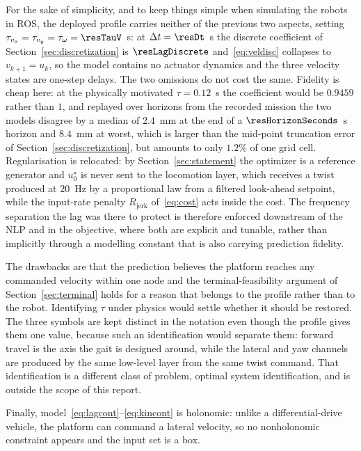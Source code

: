 \documentclass[11pt,a4paper]{article}
\newcommand{\Rjerk}{R_{\mathrm{jerk}}}
\begin{document}
For the sake of simplicity, and to keep things simple when simulating the robots in ROS, the deployed profile carries neither of the previous two aspects, setting $\tau_{v_x}=\tau_{v_y}=\tau_\omega=\resTauV$~s: at
$\Delta t=\resDt$~s the discrete coefficient of Section~\ref{sec:discretization} is $\resLagDiscrete$
and~\eqref{eq:veldisc} collapses to $v_{k+1}=u_k$, so the model contains no actuator dynamics and the three
velocity states are one-step delays. The two omissions do not cost the same. Fidelity is cheap here: at the
physically motivated $\tau=0.12$~s the coefficient would be $0.9459$ rather than $1$, and replayed over
horizons from the recorded mission the two models disagree by a median of $2.4$~mm at the end of a
$\resHorizonSeconds$~s horizon and $8.4$~mm at worst, which is larger than the mid-point truncation error of
Section~\ref{sec:discretization}, but amounts to only $1.2\%$ of one grid cell. Regularisation is relocated: by Section~\ref{sec:statement} the optimizer is a reference generator and $u^\star_0$ is never
sent to the locomotion layer, which receives a twist produced at $20$~Hz by a proportional law from a
filtered look-ahead setpoint, while the input-rate penalty $\Rjerk$ of~\eqref{eq:cost} acts inside the cost.
The frequency separation the lag was there to protect is therefore enforced downstream of the NLP and in the
objective, where both are explicit and tunable, rather than implicitly through a modelling constant that is
also carrying prediction fidelity.

The drawbacks are that the prediction believes the platform reaches any commanded velocity
within one node and the terminal-feasibility
argument of Section~\ref{sec:terminal} holds for a reason that belongs to the profile rather than to the
robot. Identifying $\tau$ under physics would settle whether it should be restored. The three symbols are
kept distinct in the notation even though the profile gives them one value, because such an identification
would separate them: forward travel is the axis the gait is designed around, while the lateral and yaw
channels are produced by the same low-level layer from the same twist command. That identification is a
different class of problem, optimal system identification, and is outside the scope of this report.

Finally, model~\eqref{eq:lagcont}--\eqref{eq:kincont} is holonomic: unlike a differential-drive vehicle, the platform
can command a lateral velocity, so no nonholonomic constraint appears and the input set is a box.
\end{document}
